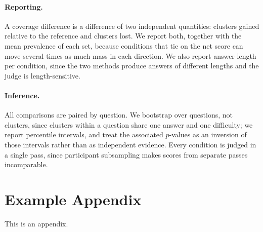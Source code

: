\documentclass[11pt]{article}
\begin{document}
\paragraph{Reporting.} A coverage difference is a difference of two independent
quantities: clusters gained relative to the reference and clusters lost. We
report both, together with the mean prevalence of each set, because conditions
that tie on the net score can move several times as much mass in each direction.
We also report answer length per condition, since the two methods produce
answers of different lengths and the judge is length-sensitive.

\paragraph{Inference.} All comparisons are paired by question. We bootstrap over
questions, not clusters, since clusters within a question share one answer and
one difficulty; we report percentile intervals, and treat the associated
$p$-values as an inversion of those intervals rather than as independent
evidence. Every condition is judged in a single pass, since participant
subsampling makes scores from separate passes incomparable.

%



\appendix

\section{Example Appendix}
\label{sec:appendix}

This is an appendix.
\end{document}
